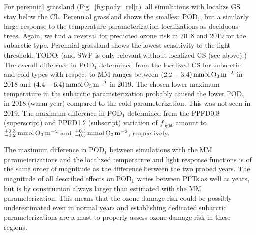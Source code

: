 \documentclass[bg, manuscript]{copernicus}
\begin{document}
For perennial grassland (Fig.~\ref{fig:pody_rel}c), all simulations with localize GS stay below the CL. Perennial grassland shows the smallest $\mathrm{POD_1}$, but a similarly large response to the temperature parameterization localizations as deciduous trees. Again, we find a reversal for predicted ozone risk in 2018 and 2019 for the subarctic type. Perennial grassland shows the lowest sensitivity to the light threshold. TODO: (and SWP is only relevant without localized GS (see above).) The overall difference in $\mathrm{POD_1}$ determined from the localized GS for subarctic and cold types with respect to MM ranges between $(2.2-3.4)\,\unit{mmol\,\chem{O_3}\,m^{-2}}$ in 2018 and $(4.4-6.4)\,\unit{mmol\,\chem{O_3}\,m^{-2}}$ in 2019. The chosen lower maximum temperature in the subarctic parameterization probably caused the lower $\mathrm{POD_1}$ in 2018 (warm year) compared to the cold parameterization. This was not seen in 2019. The maximum difference in $\mathrm{POD_1}$ determined from the PPFD0.8 (superscript) and PPFD1.2 (subscript) variation of $f_\mathrm{light}$ amount to $^{+0.3}_{-0.2}\,\unit{mmol\,\chem{O_3}\,m^{-2}}$ and $^{+0.3}_{-0.3}\,\unit{mmol\,\chem{O_3}\,m^{-2}}$, respectively.

The maximum difference in $\mathrm{POD_1}$ between simulations with the MM parameterizations and the localized temperature and light response functions is of the same order of magnitude as the difference between the two probed years. The magnitude of all described effects on $\mathrm{POD_1}$ varies between PFTs as well as years, but is by construction always larger than estimated with the MM parameterization. This means that the ozone damage risk could be possibly underestimated even in normal years and establishing dedicated subarctic parameterizations are a must to properly assess ozone damage risk in these regions.
\end{document}
